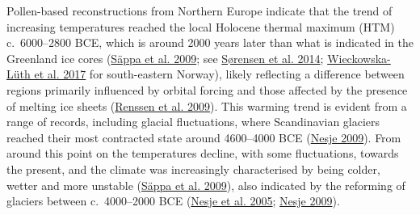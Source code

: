 \documentclass[
  a4paper,
  oneside]{uiophdthesis}
\begin{document}
Pollen-based reconstructions from Northern Europe indicate that the trend of increasing temperatures reached the local Holocene thermal maximum (HTM) c.~6000--2800 BCE, which is around 2000 years later than what is indicated in the Greenland ice cores (\protect\hyperlink{ref-seppa2009}{Säppa et al. 2009}; see \protect\hyperlink{ref-suxf8rensen2014}{Sørensen et al. 2014}; \protect\hyperlink{ref-wieckowska-luth2017}{Wieckowska-Lüth et al. 2017} for south-eastern Norway), likely reflecting a difference between regions primarily influenced by orbital forcing and those affected by the presence of melting ice sheets (\protect\hyperlink{ref-renssen2009}{Renssen et al. 2009}). This warming trend is evident from a range of records, including glacial fluctuations, where Scandinavian glaciers reached their most contracted state around 4600--4000 BCE (\protect\hyperlink{ref-nesje2009}{Nesje 2009}). From around this point on the temperatures decline, with some fluctuations, towards the present, and the climate was increasingly characterised by being colder, wetter and more unstable (\protect\hyperlink{ref-seppa2009}{Säppa et al. 2009}), also indicated by the reforming of glaciers between c.~4000--2000 BCE (\protect\hyperlink{ref-nesje2005}{Nesje et al. 2005}; \protect\hyperlink{ref-nesje2009}{Nesje 2009}).
\end{document}

